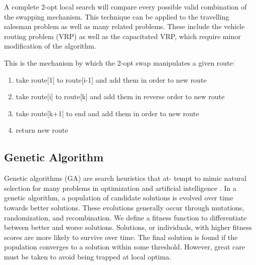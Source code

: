 \documentclass[10pt,twocolumn,letterpaper]{article}
\begin{document}
A complete 2-opt local search will compare every possible valid combination of the swapping mechanism. This technique can be applied to the travelling salesman problem as well as many related problems. These include the vehicle routing problem (VRP) as well as the capacitated VRP, which require minor modification of the algorithm.

This is the mechanism by which the 2-opt swap manipulates a given route:
\begin{enumerate}
\item take route[1] to route[i-1] and add them in order to new route
\item take route[i] to route[k] and add them in reverse order to new route
\item take route[k+1] to end and add them in order to new route
\item return new route
\end{enumerate}
 
%

\subsection{Genetic Algorithm}\label{sec:genetic}
Genetic algorithms (GA) are search heuristics that at-
tempt to mimic natural selection for many problems in optimization and artificial intelligence \cite{grefenstette1985genetic}. In a genetic algorithm, a population of candidate solutions is evolved over
time towards better solutions. These evolutions generally
occur through mutations, randomization, and recombination. We define a fitness function to differentiate between
better and worse solutions. Solutions, or individuals, with
higher fitness scores are more likely to survive over time.
The final solution is found if the population converges to a solution within some threshold. However, great care must
be taken to avoid being trapped at local optima.
\end{document}
